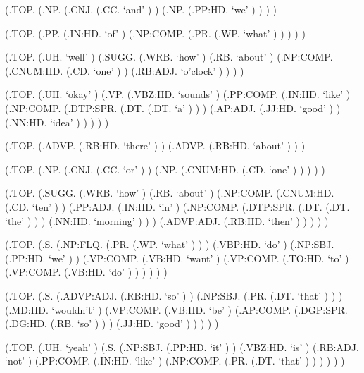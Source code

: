 \documentclass[10pt]{article}
\begin{document}
\begin{parsetree}  (.TOP. (.NP. (.CNJ. (.CC. `and' ) ) (.NP. (.PP:HD. `we' ) ) ) ) \end{parsetree}

\begin{parsetree}  (.TOP. (.PP. (.IN:HD. `of' ) (.NP:COMP. (.PR. (.WP. `what' ) ) ) ) ) \end{parsetree}

\begin{parsetree}  (.TOP. (.UH. `well' ) (.SUGG. (.WRB. `how' ) (.RB. `about' ) (.NP:COMP. (.CNUM:HD. (.CD. `one' ) ) (.RB:ADJ. `o'clock' ) ) ) ) \end{parsetree}

\begin{parsetree}  (.TOP. (.UH. `okay' ) (.VP. (.VBZ:HD. `sounds' ) (.PP:COMP. (.IN:HD. `like' ) (.NP:COMP. (.DTP:SPR. (.DT. (.DT. `a' ) ) ) (.AP:ADJ. (.JJ:HD. `good' ) ) (.NN:HD. `idea' ) ) ) ) ) \end{parsetree}

\begin{parsetree}  (.TOP. (.ADVP. (.RB:HD. `there' ) ) (.ADVP. (.RB:HD. `about' ) ) ) \end{parsetree}

\begin{parsetree}  (.TOP. (.NP. (.CNJ. (.CC. `or' ) ) (.NP. (.CNUM:HD. (.CD. `one' ) ) ) ) ) \end{parsetree}

\begin{parsetree}  (.TOP. (.SUGG. (.WRB. `how' ) (.RB. `about' ) (.NP:COMP. (.CNUM:HD. (.CD. `ten' ) ) (.PP:ADJ. (.IN:HD. `in' ) (.NP:COMP. (.DTP:SPR. (.DT. (.DT. `the' ) ) ) (.NN:HD. `morning' ) ) ) (.ADVP:ADJ. (.RB:HD. `then' ) ) ) ) ) \end{parsetree}

\begin{parsetree}  (.TOP. (.S. (.NP:FLQ. (.PR. (.WP. `what' ) ) ) (.VBP:HD. `do' ) (.NP:SBJ. (.PP:HD. `we' ) ) (.VP:COMP. (.VB:HD. `want' ) (.VP:COMP. (.TO:HD. `to' ) (.VP:COMP. (.VB:HD. `do' ) ) ) ) ) ) \end{parsetree}

\begin{parsetree}  (.TOP. (.S. (.ADVP:ADJ. (.RB:HD. `so' ) ) (.NP:SBJ. (.PR. (.DT. `that' ) ) ) (.MD:HD. `wouldn't' ) (.VP:COMP. (.VB:HD. `be' ) (.AP:COMP. (.DGP:SPR. (.DG:HD. (.RB. `so' ) ) ) (.JJ:HD. `good' ) ) ) ) ) \end{parsetree}

\begin{parsetree}  (.TOP. (.UH. `yeah' ) (.S. (.NP:SBJ. (.PP:HD. `it' ) ) (.VBZ:HD. `is' ) (.RB:ADJ. `not' ) (.PP:COMP. (.IN:HD. `like' ) (.NP:COMP. (.PR. (.DT. `that' ) ) ) ) ) ) \end{parsetree}
\end{document}
